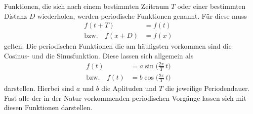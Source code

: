 Funktionen, die sich nach einem bestimmten Zeitraum $T$ oder einer bestimmten
Distanz $D$ wiederholen, werden periodische Funktionen genannt. Für diese muss
\begin{align}
  f(t + T) &= f(t) \\
  \text{bzw.}\quad f(x + D) &= f(x)
\end{align}
gelten. Die periodischen Funktionen die am häufigsten vorkommen sind die
Cosinus- und die Sinusfunktion. Diese lassen sich allgemein als
\begin{align}
  f(t) &= a\sin\biggl(\frac{2\pi}{T}\,t\biggr) \\
    \text{bzw.}\quad f(t) &= b\cos\biggl(\frac{2\pi}{T}\,t\biggr)
\end{align}
darstellen. Hierbei sind $a$ und $b$ die Aplituden und $T$ die jeweilige
Periodendauer. Fast alle der in der Natur vorkommenden periodischen Vorgänge
lassen sich mit diesen Funktionen darstellen.
